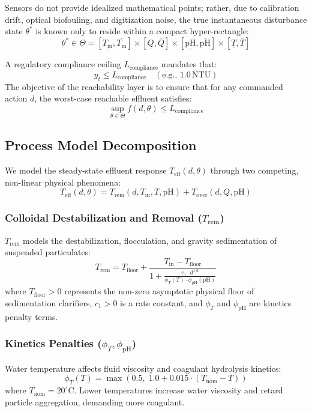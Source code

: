 \documentclass[10pt,twocolumn,letterpaper]{article}
\theoremstyle{definition}
\newcommand{\Trem}{T_{\text{rem}}}
\newcommand{\Tover}{T_{\text{over}}}
\newcommand{\Tin}{T_{\text{in}}}
\newcommand{\Tfloor}{T_{\text{floor}}}
\newcommand{\Tnom}{T_{\text{nom}}}
\newcommand{\phipH}{\phi_{\text{pH}}}
\newcommand{\phiT}{\phi_T}
\newcommand{\Lcomp}{L_{\text{compliance}}}
\begin{document}
Sensors do not provide idealized mathematical points; rather, due to calibration drift, optical biofouling, and digitization noise, the true instantaneous disturbance state $\theta^*$ is known only to reside within a compact hyper-rectangle:
\begin{equation}
\theta^* \in \Theta = [\underline{\Tin}, \overline{\Tin}] \times [\underline{Q}, \overline{Q}] \times [\underline{\text{pH}}, \overline{\text{pH}}] \times [\underline{T}, \overline{T}]
\end{equation}

A regulatory compliance ceiling $\Lcomp$ mandates that:
\begin{equation}
y_t \le \Lcomp \quad (\text{e.g., } 1.0\,\text{NTU})
\end{equation}
The objective of the reachability layer is to ensure that for any commanded action $d$, the worst-case reachable effluent satisfies:
\begin{equation}
\sup_{\theta \in \Theta} f(d, \theta) \le \Lcomp
\end{equation}

\subsection{Process Model Decomposition}
We model the steady-state effluent response $T_{\text{eff}}(d, \theta)$ through two competing, non-linear physical phenomena:
\begin{equation}
T_{\text{eff}}(d, \theta) = \Trem(d, \Tin, T, \text{pH}) + \Tover(d, Q, \text{pH})
\end{equation}

\subsubsection{Colloidal Destabilization and Removal ($\Trem$)}
$\Trem$ models the destabilization, flocculation, and gravity sedimentation of suspended particulates:
\begin{equation}
\Trem = \Tfloor + \frac{\Tin - \Tfloor}{1 + \frac{c_1 \cdot d^{1.6}}{\phiT(T) \cdot \phipH(\text{pH})}}
\end{equation}
where $\Tfloor > 0$ represents the non-zero asymptotic physical floor of sedimentation clarifiers, $c_1 > 0$ is a rate constant, and $\phiT$ and $\phipH$ are kinetics penalty terms.

\subsubsection{Kinetics Penalties ($\phiT, \phipH$)}
Water temperature affects fluid viscosity and coagulant hydrolysis kinetics:
\begin{equation}
\phiT(T) = \max\left(0.5, \; 1.0 + 0.015 \cdot (\Tnom - T)\right)
\end{equation}
where $\Tnom = 20^\circ\text{C}$. Lower temperatures increase water viscosity and retard particle aggregation, demanding more coagulant.
\end{document}

